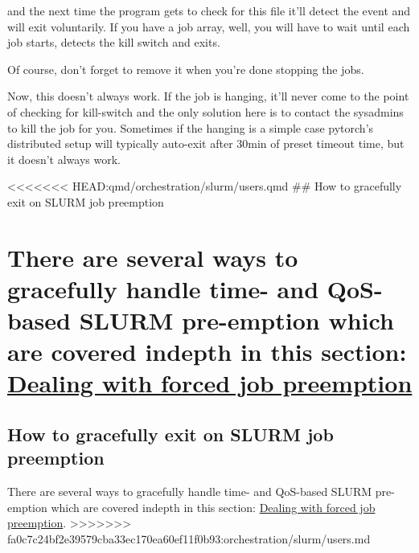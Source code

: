 \documentclass[
]{report}
\newenvironment{Shaded}{\begin{snugshade}}{\end{snugshade}}
\newcommand{\FunctionTok}[1]{\textcolor[rgb]{0.28,0.35,0.67}{#1}}
\newcommand{\NormalTok}[1]{\textcolor[rgb]{0.00,0.23,0.31}{#1}}
\newcommand{\VariableTok}[1]{\textcolor[rgb]{0.07,0.07,0.07}{#1}}
\begin{document}
and the next time the program gets to check for this file it'll detect
the event and will exit voluntarily. If you have a job array, well, you
will have to wait until each job starts, detects the kill switch and
exits.

Of course, don't forget to remove it when you're done stopping the jobs.

\begin{Shaded}
\end{Shaded}

Now, this doesn't always work. If the job is hanging, it'll never come
to the point of checking for kill-switch and the only solution here is
to contact the sysadmins to kill the job for you. Sometimes if the
hanging is a simple case pytorch's distributed setup will typically
auto-exit after 30min of preset timeout time, but it doesn't always
work.

\textless\textless\textless\textless\textless\textless\textless{}
HEAD:qmd/orchestration/slurm/users.qmd \#\# How to gracefully exit on
SLURM job preemption

\chapter{\texorpdfstring{There are several ways to gracefully handle
time- and QoS-based SLURM pre-emption which are covered indepth in this
section:
\href{https://saforem2.github.io/ml-engineering/qmd/training/fault-tolerance/\#dealing-with-forced-resource-preemption}{Dealing
with forced job
preemption}}{There are several ways to gracefully handle time- and QoS-based SLURM pre-emption which are covered indepth in this section: Dealing with forced job preemption}}\label{there-are-several-ways-to-gracefully-handle-time--and-qos-based-slurm-pre-emption-which-are-covered-indepth-in-this-section-dealing-with-forced-job-preemption}

\section{How to gracefully exit on SLURM job
preemption}\label{how-to-gracefully-exit-on-slurm-job-preemption}

There are several ways to gracefully handle time- and QoS-based SLURM
pre-emption which are covered indepth in this section:
\href{../../training/fault-tolerance/\#dealing-with-forced-job-preemption}{Dealing
with forced job preemption}.
\textgreater\textgreater\textgreater\textgreater\textgreater\textgreater\textgreater{}
fa0c7c24bf2e39579cba33ec170ea60ef11f0b93:orchestration/slurm/users.md
\end{document}
